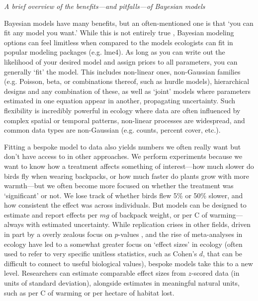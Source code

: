 \documentclass[11pt]{article}
\begin{document}
\emph{A brief overview of the benefits---and pitfalls---of Bayesian models} 

Bayesian models have many benefits, but an often-mentioned one is that `you can fit any model you want.' While this is not entirely true \citep{BDA,reid2019}, Bayesian modeling options can feel limitless when compared to the models ecologists can fit in popular modeling packages (e.g. \textsf{lme4}). As long as you can write out the likelihood of your desired model \citep[and sometimes even if you can't;][]{Sunnaaker2013} and assign priors to all parameters, you can generally `fit' the model. This includes non-linear ones, non-Gaussian families (e.g. Poisson, beta, or combinations thereof, such as hurdle models), hierarchical designs and any combination of these, as well as `joint' models where parameters estimated in one equation appear in another, propagating uncertainty. Such flexibility is incredibly powerful in ecology where data are often influenced by complex spatial or temporal patterns, non-linear processes are widespread, and common data types are non-Gaussian (e.g. counts, percent cover, etc.). 

Fitting a bespoke model to data also yields numbers we often really want but don't have access to in other approaches. We perform experiments because we want to know how a treatment affects something of interest---how much slower do birds fly when wearing backpacks, or how much faster do plants grow with more warmth---but we often become more focused on whether the treatment was `significant' or not. We lose track of whether birds flew 5\% or 50\% slower, and how consistent the effect was across individuals. But models can be designed to estimate and report effects per $mg$ of backpack weight, or per \degree C of warming---always with estimated uncertainty. While replication crises in other fields, driven in part by a overly zealous focus on $p$-values \citep{halsey2015,loken2017}, and the rise of meta-analyses in ecology \citep{Hampton2013} have led to a somewhat greater focus on `effect sizes' in ecology (often used to refer to very specific unitless statistics, such as Cohen's $d$, that can be difficult to connect to useful biological values), bespoke models take this to a new level. Researchers can estimate comparable effect sizes from $z$-scored data (in units of standard deviation), alongside estimates in meaningful natural units, such as per \degree C of warming or per hectare of habitat lost.
\end{document}
